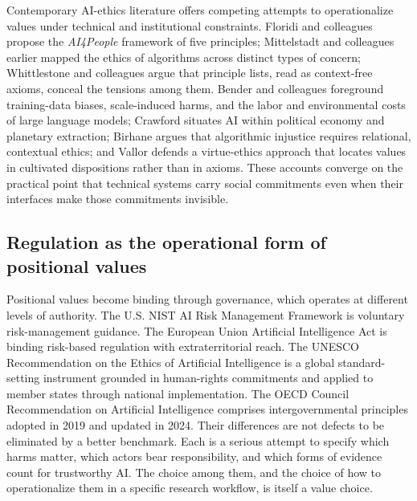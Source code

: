 \documentclass[11pt,letterpaper]{article}
\begin{document}
Contemporary AI-ethics literature offers competing attempts to
operationalize values under technical and institutional constraints.
Floridi and colleagues \cite{floridi2018ai4people} propose the
\emph{AI4People} framework of five principles; Mittelstadt and
colleagues \cite{mittelstadt2016ethics} earlier mapped the ethics of
algorithms across distinct types of concern; Whittlestone and colleagues
\cite{whittlestone2019role} argue that principle lists, read as
context-free axioms, conceal the tensions among them. Bender and
colleagues \cite{bender2021} foreground training-data biases,
scale-induced harms, and the labor and environmental costs of large
language models; Crawford \cite{crawford2021atlas} situates AI within
political economy and planetary extraction; Birhane
\cite{birhane2021algorithmic} argues that algorithmic injustice requires
relational, contextual ethics; and Vallor \cite{vallor2016technology}
defends a virtue-ethics approach that locates values in cultivated
dispositions rather than in axioms. These accounts converge on the
practical point that technical systems carry social commitments even
when their interfaces make those commitments invisible.

\subsection{Regulation as the operational form of positional values}
\label{sec:intro:regulation}

Positional values become binding through governance, which operates at
different levels of authority. The U.S. NIST AI Risk Management
Framework \cite{nist_rmf} is voluntary risk-management
guidance. The European Union Artificial Intelligence Act
\cite{eu_aiact} is binding risk-based regulation with
extraterritorial reach. The UNESCO Recommendation on the Ethics of
Artificial Intelligence \cite{unesco_ai} is a global
standard-setting instrument grounded in human-rights commitments
and applied to member states through national implementation. The
OECD Council Recommendation on Artificial Intelligence
\cite{oecd_ai} comprises intergovernmental principles
adopted in 2019 and updated in 2024. Their differences are not
defects to be eliminated by a better benchmark. Each is a serious
attempt to specify which harms matter, which actors bear
responsibility, and which forms of evidence count for trustworthy AI.
The choice among them, and the choice of how to operationalize them
in a specific research workflow, is itself a value choice.
\end{document}
